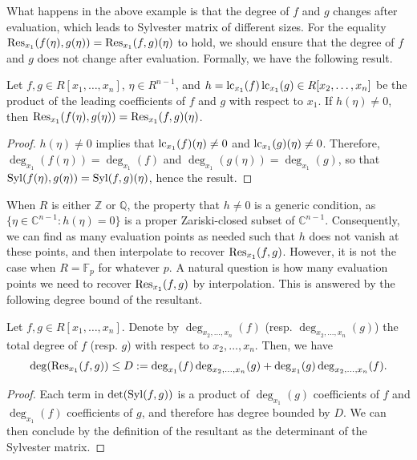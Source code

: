 What happens in the above example is that the degree of $f$ and $g$ changes after evaluation, which leads to Sylvester matrix of different sizes. For the equality $\operatorname{Res}_{x_1}(f(\eta),g(\eta))=\operatorname{Res}_{x_1}(f,g)(\eta)$ to hold, we should ensure that the degree of $f$ and $g$ does not change after evaluation. Formally, we have the following result.

\begin{proposition}
    Let $f,g\in R[x_1,\dots,x_n]$, $\eta\in R^{n-1}$, and $h=\operatorname{lc}_{x_1}(f)\operatorname{lc}_{x_1}(g)\in R[x_2,\dots,x_n]$ be the product of the leading coefficients of $f$ and $g$ with respect to $x_1$. If $h(\eta)\neq 0$, then $\operatorname{Res}_{x_1}(f(\eta),g(\eta))=\operatorname{Res}_{x_1}(f,g)(\eta)$.
\end{proposition}

\begin{proof}
    $h(\eta)\neq 0$ implies that $\operatorname{lc}_{x_1}(f)(\eta)\neq 0$ and $\operatorname{lc}_{x_1}(g)(\eta)\neq 0$. Therefore, $\deg_{x_1}(f(\eta))=\deg_{x_1}(f)$ and $\deg_{x_1}(g(\eta))=\deg_{x_1}(g)$, so that $\operatorname{Syl}(f(\eta),g(\eta))=\operatorname{Syl}(f,g)(\eta)$, hence the result.
\end{proof}

When $R$ is either $\mathbb{Z}$ or $\mathbb{Q}$, the property that $h\neq 0$ is a generic condition, as $\lbrace\eta\in\mathbb{C}^{n-1} : h(\eta)=0\rbrace$ is a proper Zariski-closed subset of $\mathbb{C}^{n-1}$. Consequently, we can find as many evaluation points as needed such that $h$ does not vanish at these points, and then interpolate to recover $\operatorname{Res}_{x_1}(f,g)$. However, it is not the case when $R=\mathbb{F}_p$ for whatever $p$. A natural question is how many evaluation points we need to recover $\operatorname{Res}_{x_1}(f,g)$ by interpolation. This is answered by the following degree bound of the resultant.

\begin{proposition}
    Let $f,g\in R[x_1,\dots,x_n]$. Denote by $\deg_{x_2,\dots,x_n}(f)$ (resp. $\deg_{x_2,\dots,x_n}(g)$) the total degree of $f$ (resp. $g$) with respect to $x_2,\dots,x_n$. Then, we have
    \begin{equation*}
        \deg(\operatorname{Res}_{x_1}(f,g)) \leq D := \deg_{x_1}(f)\deg_{x_2,\dots,x_n}(g) + \deg_{x_1}(g)\deg_{x_2,\dots,x_n}(f).
    \end{equation*}
\end{proposition}

\begin{proof}
    Each term in $\det(\operatorname{Syl}(f,g))$ is a product of $\deg_{x_1}(g)$ coefficients of $f$ and $\deg_{x_1}(f)$ coefficients of $g$, and therefore has degree bounded by $D$. We can then conclude by the definition of the resultant as the determinant of the Sylvester matrix.
\end{proof}

